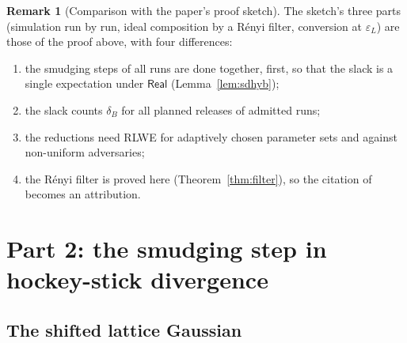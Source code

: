 \documentclass[11pt]{article}
\theoremstyle{definition}
\newtheorem{remark}[definition]{Remark}
\theoremstyle{plain}
\newcommand{\Real}{\mathsf{Real}}
\begin{document}
\begin{remark}[Comparison with the paper's proof sketch]\label{rem:sketch}
The sketch's three parts (simulation run by run, ideal composition by a R\'enyi filter, conversion at $\varepsilon_L$) are those of the proof above, with four differences:
\begin{enumerate}[nosep,label=(\roman*)]
  \item the smudging steps of all runs are done together, first, so that the slack is a single expectation under $\Real$ (Lemma~\ref{lem:sdhyb});
  \item the slack counts $\delta_B$ for all planned releases of admitted runs;
  \item the reductions need RLWE for adaptively chosen parameter sets and against non-uniform adversaries;
  \item the R\'enyi filter is proved here (Theorem~\ref{thm:filter}), so the citation of~\cite{FZ21} becomes an attribution.
\end{enumerate}
\end{remark}

\section{Part 2: the smudging step in hockey-stick divergence}
\label{sec:hs}

\subsection{The shifted lattice Gaussian}
\end{document}
